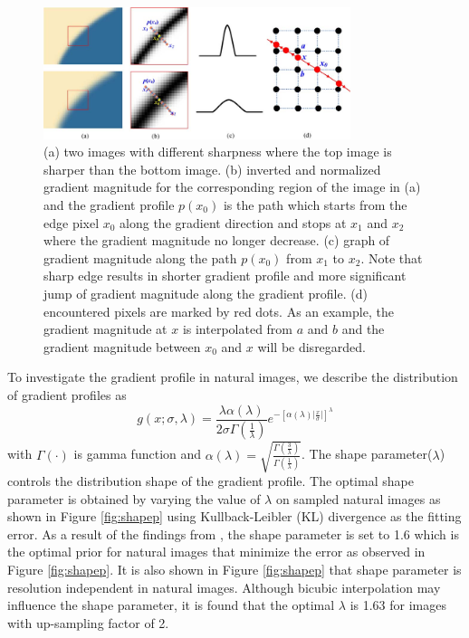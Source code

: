 \documentclass[a4paper,11pt]{article}
\begin{document}
\begin{figure}[H]
	\centering
	\includegraphics[width=0.8\textwidth]{Gradient-profile-a-Two-edges-with-different-sharpness-b-Gradient-maps-normalized.png}
	\caption{(a) two images with different sharpness where the top image is sharper than the bottom image. (b) inverted and normalized gradient magnitude for the corresponding region of the image in (a) and the gradient profile $p(x_0)$ is the path which starts from the edge pixel $x_0$ along the gradient direction and stops at $x_1$ and $x_2$ where the gradient magnitude no longer decrease. (c) graph of gradient magnitude along the path $p(x_0)$ from  $x_1$ to $x_2$. Note that sharp edge results in shorter gradient profile and more significant jump of gradient magnitude along the gradient profile. (d) encountered pixels are marked by red dots. As an example, the gradient magnitude at $x$ is interpolated from $a$ and $b$ and the gradient magnitude between $x_0$ and $x$ will be disregarded.}
	\label{fig:gp}
\end{figure}

To investigate the gradient profile in natural images, we describe the distribution of gradient profiles as
\begin{equation}
	g(x; \sigma, \lambda) = \frac{\lambda \alpha (\lambda)}{2 \sigma \Gamma(\frac{1}{\lambda})} e^{-[\alpha (\lambda)\lvert \frac{x}{\sigma} \rvert]^\lambda}
\end{equation}
with $\Gamma(\cdot)$ is gamma function and $\alpha (\lambda) = \sqrt{\frac{\Gamma(\frac{3}{\lambda})}{\Gamma(\frac{1}{\lambda})}}$. The shape parameter($\lambda$) controls the distribution shape of the gradient profile. The optimal shape parameter is obtained by varying the value of $\lambda$ on sampled natural images as shown in Figure \ref{fig:shapep} using Kullback-Leibler (KL) divergence as the fitting error. As a result of the findings from \cite{sr11}, the shape parameter is set to 1.6 which is the optimal prior for natural images that minimize the error as observed in Figure \ref{fig:shapep}. It is also shown in Figure \ref{fig:shapep} that shape parameter is resolution independent in natural images. Although bicubic interpolation may influence the shape parameter, it is found that the optimal $\lambda$ is 1.63 for images with up-sampling factor of 2. 
\end{document}
